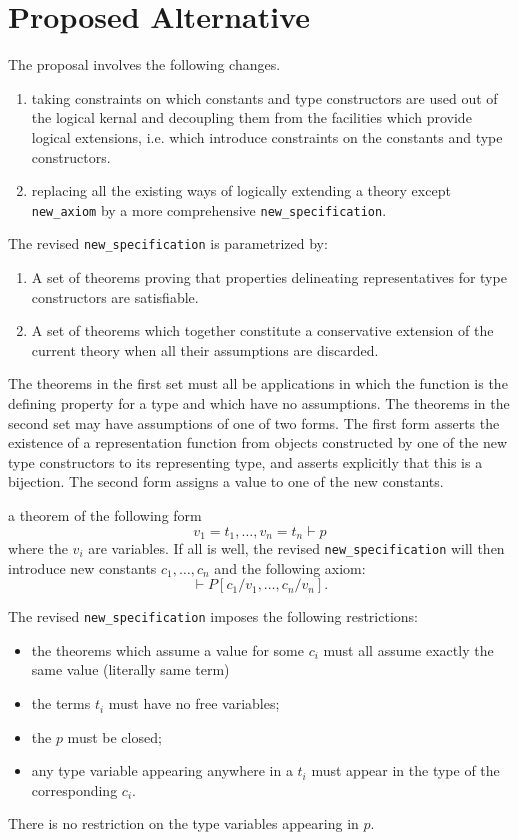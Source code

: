 \documentclass[12pt]{article}
\def\NewSpec{{\tt new\_specification}}
\begin{document}
\section{Proposed Alternative}

The proposal involves the following changes.

\begin{enumerate}
\item taking constraints on which constants and type constructors are used out of the logical kernal and decoupling them from the facilities which provide logical extensions, i.e. which introduce constraints on the constants and type constructors.
\item replacing all the existing ways of logically extending a theory except {\tt new\_axiom} by a more comprehensive {\NewSpec}.
\end{enumerate}

The revised {\NewSpec} is parametrized by:

\begin{enumerate}
\item A set of theorems proving that properties delineating representatives for type constructors are satisfiable.
\item A set of theorems which together constitute a conservative extension of the current theory when all their assumptions are discarded.
\end{enumerate}

The theorems in the first set must all be applications in which the function is the defining property for a type and which have no assumptions.
The theorems in the second set may have assumptions of one of two forms.
The first form asserts the existence of a representation function from objects constructed by one of the new type constructors to its representing type, and asserts explicitly that this is a bijection.
The second form assigns a value to one of the new constants.

 a theorem of the following form
$$
v_1 = t_1, \ldots, v_n = t_n \vdash p
$$
where the $v_i$ are variables. If all is well, the revised {\NewSpec} will then introduce new constants $c_1, \ldots, c_n$ and the following axiom:
$$
\vdash P[c_1/v_1, \ldots, c_n/v_n].
$$

The revised {\NewSpec} imposes the following restrictions:
\begin{itemize}
\item the theorems which assume a value for some $c_i$ must all assume exactly the same value (literally same term)
\item the terms $t_i$ must have no free variables;
\item the $p$ must be closed;
\item any type variable appearing anywhere in a $t_i$ must appear in the type of the corresponding $c_i$.
\end{itemize}
There is no restriction on the type variables appearing in $p$.
\end{document}
